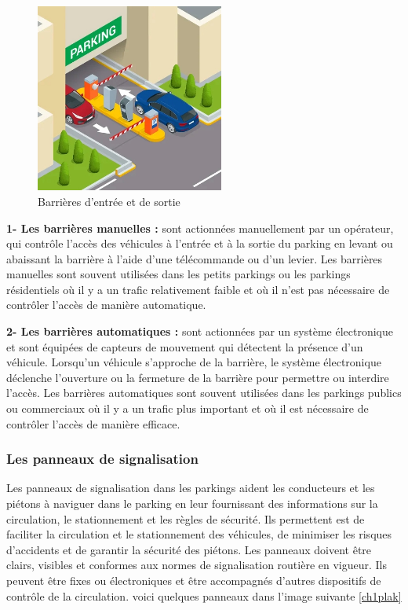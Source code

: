 \begin{figure}[H]
	\centering
	\includegraphics[height=06.2cm]{img/ch1-barrier-01.jpg}
	\caption{ Barrières d'entrée et de sortie}
  \label{ch1barrier}
\end{figure}

\textbf{1- Les barrières manuelles : } sont actionnées manuellement par un opérateur, qui contrôle l'accès des véhicules à l'entrée et à la sortie du parking en levant ou abaissant la barrière à l'aide d'une télécommande ou d'un levier. Les barrières manuelles sont souvent utilisées dans les petits parkings ou les parkings résidentiels où il y a un trafic relativement faible et où il n'est pas nécessaire de contrôler l'accès de manière automatique.

\textbf{2- Les barrières automatiques : } sont actionnées par un système électronique et sont équipées de capteurs de mouvement qui détectent la présence d'un véhicule. Lorsqu'un véhicule s'approche de la barrière, le système électronique déclenche l'ouverture ou la fermeture de la barrière pour permettre ou interdire l'accès. Les barrières automatiques sont souvent utilisées dans les parkings publics ou commerciaux où il y a un trafic plus important et où il est nécessaire de contrôler l'accès de manière efficace.

\subsubsection{ Les panneaux de signalisation}
Les panneaux de signalisation dans les parkings aident les conducteurs et les piétons à naviguer dans le parking en leur fournissant des informations sur la circulation, le stationnement et les règles de sécurité. Ils permettent est de faciliter la circulation et le stationnement des véhicules, de minimiser les risques d'accidents et de garantir la sécurité des piétons. Les panneaux doivent être clairs, visibles et conformes aux normes de signalisation routière en vigueur. Ils peuvent être fixes ou électroniques et être accompagnés d'autres dispositifs de contrôle de la circulation.
voici quelques panneaux dans l'image suivante \ref{ch1plak}

